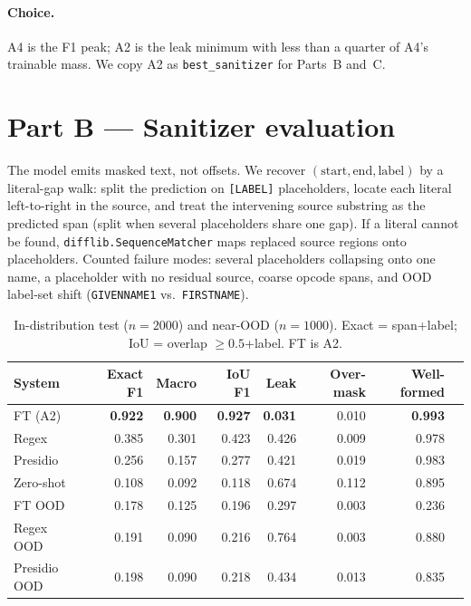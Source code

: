 \documentclass[11pt]{article}
\begin{document}
\paragraph{Choice.}
A4 is the F1 peak; A2 is the leak minimum with less than a quarter of A4's trainable mass. We copy A2 as \texttt{best\_sanitizer} for Parts~B and~C.

\section{Part B --- Sanitizer evaluation}
\label{sec:b}
\vspace{-0.15em}
The model emits masked text, not offsets. We recover $(\mathrm{start},\mathrm{end},\mathrm{label})$ by a literal-gap walk: split the prediction on \texttt{[LABEL]} placeholders, locate each literal left-to-right in the source, and treat the intervening source substring as the predicted span (split when several placeholders share one gap). If a literal cannot be found, \texttt{difflib.SequenceMatcher} maps replaced source regions onto placeholders. Counted failure modes: several placeholders collapsing onto one name, a placeholder with no residual source, coarse opcode spans, and OOD label-set shift (\texttt{GIVENNAME1} vs.\ \texttt{FIRSTNAME}).

\begin{table}[t]
\centering
\caption{In-distribution test ($n{=}2000$) and near-OOD ($n{=}1000$). Exact = span+label; IoU = overlap ${\ge}0.5$+label. FT is A2.}
\label{tab:b}
\scriptsize
\setlength{\tabcolsep}{2.4pt}
\begin{tabular}{@{}l r r r r r r r@{}}
\toprule
System & Exact F1 & Macro & IoU F1 & Leak & Over-mask & Well-formed \\
\midrule
FT (A2) & \textbf{0.922} & \textbf{0.900} & \textbf{0.927} & \textbf{0.031} & 0.010 & \textbf{0.993} \\
Regex & 0.385 & 0.301 & 0.423 & 0.426 & 0.009 & 0.978 \\
Presidio & 0.256 & 0.157 & 0.277 & 0.421 & 0.019 & 0.983 \\
Zero-shot & 0.108 & 0.092 & 0.118 & 0.674 & 0.112 & 0.895 \\
\midrule
FT OOD & 0.178 & 0.125 & 0.196 & 0.297 & 0.003 & 0.236 \\
Regex OOD & 0.191 & 0.090 & 0.216 & 0.764 & 0.003 & 0.880 \\
Presidio OOD & 0.198 & 0.090 & 0.218 & 0.434 & 0.013 & 0.835 \\
\bottomrule
\end{tabular}
\end{table}
\end{document}
